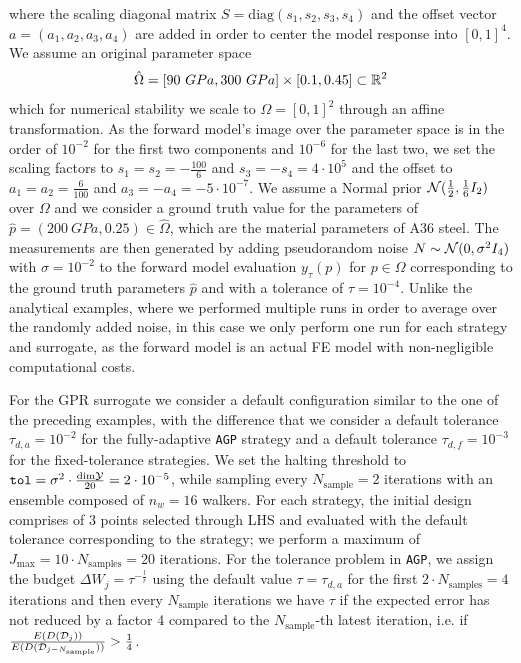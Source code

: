 where the scaling diagonal matrix $S = \text{diag}(s_1, s_2, s_3, s_4)$ and the offset vector $a = (a_1,a_2,a_3,a_4)$ are added in order to center the model response into $[0,1]^4$.
We assume an original parameter space 
\[
    \hat \Omega = [90 \ GPa, 300 \ GPa] \times [0.1, 0.45] \subset \mathbb{R}^2 
\]
which for numerical stability we scale to $\Omega = [0,1]^2$ through an affine transformation.
As the forward model's image over the parameter space is in the order of $10^{-2}$ for the first two components and $10^{-6}$ for the last two, we set the scaling factors to $s_1 = s_2 = - \frac{100}{6}$ and $s_3 = - s_4 = 4 \cdot 10^5$ and the offset to $a_1 = a_2 = \frac{6}{100}$ and $a_3 = - a_4 = - 5 \cdot 10^{-7}$. \newline
We assume a Normal prior $\mathcal N(\frac{1}{2}, \frac{1}{6}I_2)$ over $\Omega$ and we consider a ground truth value for the parameters of $\hat p = (200 \ GPa, 0.25) \in \hat \Omega$, which are the material parameters of A36 steel.
The measurements are then generated by adding pseudorandom noise $N \sim \mathcal N (0, \sigma^2 I_4)$ with $\sigma = 10^{-2}$ to the forward model evaluation $y_\tau (p)$ for $p\in \Omega$ corresponding to the ground truth parameters $\hat p$ and with a tolerance of $\tau = 10^{-4}$.
Unlike the analytical examples, where we performed multiple runs in order to average over the randomly added noise, in this case we only perform one run for each strategy and surrogate, as the forward model is an actual FE model with non-negligible computational costs. \medskip

For the GPR surrogate we consider a default configuration similar to the one of the preceding examples, with the difference that we consider a default tolerance $\tau_{d,a}= 10^{-2}$ for the fully-adaptive \texttt{AGP} strategy and a default tolerance $\tau_{d,f} = 10^{-3}$ for the fixed-tolerance strategies.
We set the halting threshold to $\texttt{tol} = \sigma^2 \cdot \frac{\text{dim} \mathcal Y }{20} = 2\cdot 10^{-5}$, while sampling every $N_{\text{sample}} = 2$ iterations with an ensemble composed of $n_w = 16$ walkers.
For each strategy, the initial design comprises of $3$ points selected through LHS and evaluated with the default tolerance corresponding to the strategy; we perform a maximum of $J_{\max} = 10 \cdot N_{\text{samples}} = 20 $ iterations.
For the tolerance problem in \texttt{AGP}, we assign the budget $\Delta W_j = \tau ^{-\frac{l}{r}}$ using the default value $\tau= \tau_{d,a}$ for the first $2\cdot N_{\text{samples}} = 4$ iterations and then every $N_{\text{sample}}$ iterations we have $\tau$ if the expected error has not reduced by a factor 4 compared to the $N_{\text{sample}}$-th latest iteration, i.e. if $\frac{E(D(\mathcal D_j))}{E(D(\mathcal D_{j-N_{\text{sample}}}))} > \frac{1}{4}$.\medskip

